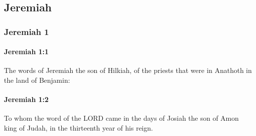 \subsection{Jeremiah}
	\label{JEREMIAH}

	\subsubsection{Jeremiah 1} %
		\label{JEREMIAH-1}

		\paragraph{Jeremiah 1:1} %
			\label{JEREMIAH-1-1}

			The words of Jeremiah the son of Hilkiah, of the priests that were in Anathoth in the land of Benjamin:


		\paragraph{Jeremiah 1:2} %
			\label{JEREMIAH-1-2}

			To whom the word of the LORD came in the days of Josiah the son of Amon king of Judah, in the thirteenth year of his reign.

